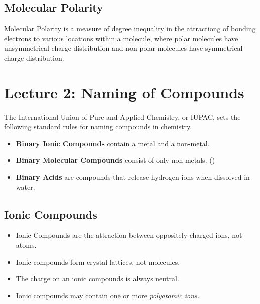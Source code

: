 \noindent
{}

\subsection{Molecular Polarity}

\begin{defn}
Molecular Polarity is a measure of degree inequality in the attractiong of bonding electrons to various locations within a molecule, where polar molecules have unsymmetrical charge distribution and non-polar molecules have symmetrical charge distribution.
\end{defn}

\noindent
{}

\section{Lecture 2: Naming of Compounds}

The International Union of Pure and Applied Chemistry, or IUPAC, sets the following standard rules for naming compounds in chemistry.

\begin{itemize}
\item \textbf{Binary Ionic Compounds} contain a metal and a non-metal.
\item \textbf{Binary Molecular Compounds} consist of only non-metals. ()
\item \textbf{Binary Acids} are compounds that release hydrogen ions when dissolved in water.
\end{itemize}

\subsection{Ionic Compounds}

\begin{itemize}
\item Ionic Compounds are the attraction between oppositely-charged ions, not atoms.
\item Ionic compounds form crystal lattices, not molecules.
\item The charge on an ionic compounds is always neutral.
\item Ionic compounds may contain one or more \textit{polyatomic ions.}
\end{itemize}


